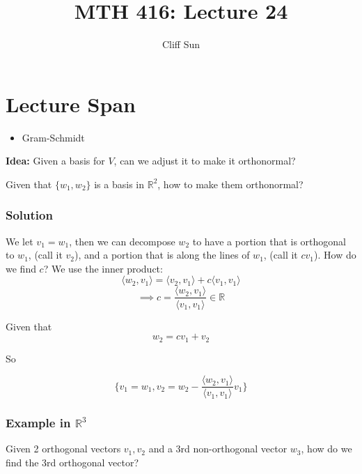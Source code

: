 \documentclass{article}
\title{MTH 416: Lecture 24}
\author{Cliff Sun}
\newtheorem{one minute paper}[theorem]{One Minute Paper}
\begin{document}
\maketitle

\section*{Lecture Span}
\begin{itemize}
    \item Gram-Schmidt 
\end{itemize}

\textbf{Idea:} Given a basis for $V$, can we adjust it to make it orthonormal? 

Given that $\{w_1,w_2\}$ is a basis in $\mathbb{R}^2$, how to make them orthonormal?

\subsubsection*{Solution}

We let $v_1 = w_1$, then we can decompose $w_2$ to have a portion that is orthogonal to $w_1$, (call it $v_2$), and a portion that is along the lines of $w_1$, (call it $cv_1$).
How do we find $c$? We use the inner product:
\begin{equation}
    \langle w_2, v_1 \rangle = \langle v_2, v_1 \rangle + c\langle v_1,v_1 \rangle 
\end{equation}
\begin{equation}
    \implies c = \frac{\langle w_2, v_1 \rangle}{\langle v_1, v_1 \rangle} \in \mathbb{R}
\end{equation}

Given that 
\begin{equation}
    w_2 = cv_1 + v_2
\end{equation}

So 

\begin{equation}
    \{v_1 = w_1, v_2 = w_2 - \frac{\langle w_2, v_1 \rangle}{\langle v_1, v_1 \rangle}v_1\}
\end{equation}

\subsubsection*{Example in $\mathbb{R}^3$}

Given 2 orthogonal vectors $v_1, v_2$ and a 3rd non-orthogonal vector $w_3$, how do we find the 3rd orthogonal vector?
\end{document}

